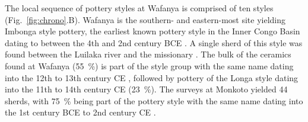 \documentclass[a4paper]{article}
\begin{document}
The local sequence of pottery styles at Wafanya is comprised of ten styles (Fig.~\ref{fig:chrono}.B). Wafanya is the southern- and eastern-most site yielding Imbonga style pottery, the earliest known pottery style in the Inner Congo Basin dating to between the 4th and 2nd century BCE \citep[59--68, 544--545 map 2]{Wotzka.1995}. A single sherd of this style was found between the Luilaka river and the missionary \citep[WAF~83/105;][399, 505 Pl.~71.1]{Wotzka.1995}. The bulk of the ceramics found at Wafanya (55~\%) is part of the style group with the same name dating into the 12th to 13th century CE \citep[163--167]{Wotzka.1995}, followed by pottery of the Longa style dating into the 11th to 14th century CE \citep[23~\%;][121--128]{Wotzka.1995} (23~\%). The surveys at Monkoto yielded 44 sherds, with 75~\% being part of the pottery style with the same name dating into the 1st century BCE to 2nd century CE \citep[94--100,400]{Wotzka.1995}.



\end{document}
